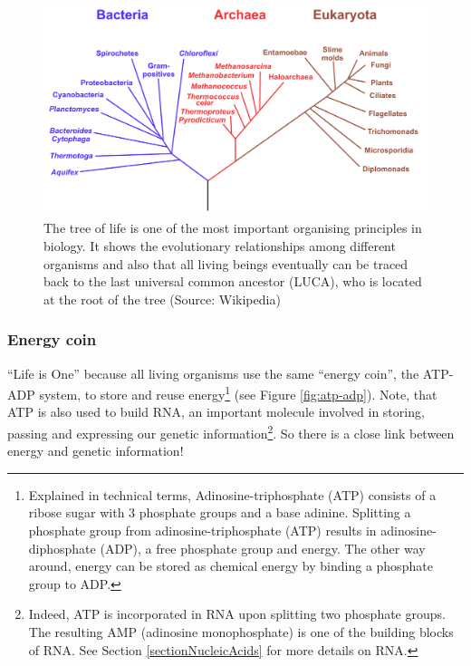 \documentclass[
  11pt,
]{book}
\begin{document}
\begin{figure}

{\centering \includegraphics[width=0.8\linewidth]{./figs/Phylogenetic_tree} 

}

\caption{The tree of life is one of the most important organising principles in biology. It shows the evolutionary relationships among different organisms and also that all living beings eventually can be traced back to the last universal common ancestor (LUCA), who is located at the root of the tree (Source: Wikipedia)}\label{fig:treeOfLife}
\end{figure}

\hypertarget{sectionEnergyCoin}{%
\subsubsection{Energy coin}\label{sectionEnergyCoin}}

``Life is One'' because all living organisms use the same ``energy coin'', the ATP-ADP system, to store and reuse energy\footnote{Explained in technical terms, Adinosine-triphosphate (ATP) consists of a ribose sugar with 3 phosphate groups and a base adinine.
  Splitting a phosphate group from adinosine-triphosphate (ATP) results in adinosine-diphosphate (ADP), a free phosphate group and energy.
  The other way around, energy can be stored as chemical energy by binding a phosphate group to ADP.} (see Figure \ref{fig:atp-adp}).
Note, that ATP is also used to build RNA, an important molecule involved in storing, passing and expressing our genetic information\footnote{Indeed, ATP is incorporated in RNA upon splitting two phosphate groups. The resulting AMP (adinosine monophosphate) is one of the building blocks of RNA. See Section \ref{sectionNucleicAcids} for more details on RNA.}. So there is a close link between energy and genetic information!
\end{document}
